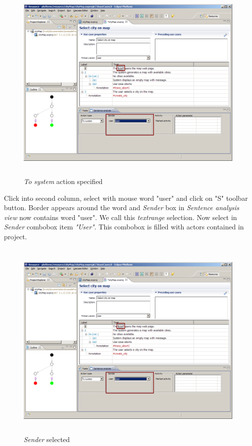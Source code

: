 \begin{figure}[ht]
  \centering
  \includegraphics[height=280pt]{images/manual-analysis/step1-action-selected}
  \caption{\emph{To system} action specified}
  \label{fig:reprotoolUCEditor}
\end{figure}

Click into second column, select with mouse word "user" and click on "S" toolbar button. Border appears around the word and \emph{Sender} box in \emph{Sentence analysis view} now contains word "user". We call this \emph{textrange} selection. Now select in \emph{Sender} combobox item \emph{"User"}. This combobox is filled with actors contained in project.

\begin{figure}[ht]
  \centering
  \includegraphics[height=280pt]{images/manual-analysis/step1-sender-selected}
  \caption{\emph{Sender} selected}
  \label{fig:reprotoolUCEditor}
\end{figure}

